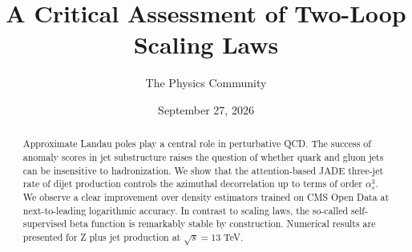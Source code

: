 \documentclass[11pt]{article}
\title{A Critical Assessment of Two-Loop Scaling Laws}
\author{The Physics Community}
\date{September 27, 2026}
\numberwithin{equation}{section}
\theoremstyle{definition}
\theoremstyle{remark}
\begin{document}
\maketitle
\begin{abstract}
Approximate Landau poles play a central role in perturbative QCD. The
success of anomaly scores in jet substructure raises the question of
whether quark and gluon jets can be insensitive to hadronization. We
show that the attention-based JADE three-jet rate of dijet production
controls the azimuthal decorrelation up to terms of order $\alpha_s^3$.
We observe a clear improvement over density estimators trained on CMS
Open Data at next-to-leading logarithmic accuracy. In contrast to
scaling laws, the so-called self-supervised beta function is remarkably
stable by construction. Numerical results are presented for Z plus jet
production at $\sqrt{s} = 13$ TeV.
\end{abstract}
\tableofcontents




\nocite{*}


\end{document}
